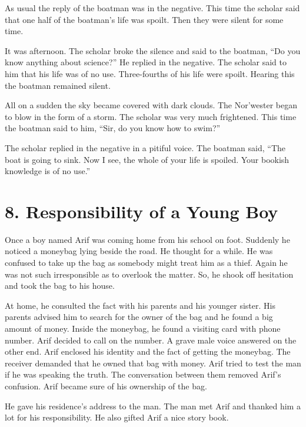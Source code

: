 \documentclass{article}
\begin{document}
As usual the reply of the boatman was in the negative. This time the scholar said that one half of the boatman's life was spoilt. Then they were silent for some time.

It was afternoon. The scholar broke the silence and said to the boatman, “Do you know anything about science?” He replied in the negative. The scholar said to him that his life was of no use. Three-fourths of his life were spoilt. Hearing this the boatman remained silent.

All on a sudden the sky became covered with dark clouds. The Nor'wester began to blow in the form of a storm. The scholar was very much frightened. This time the boatman said to him, “Sir, do you know how to swim?”

The scholar replied in the negative in a pitiful voice. The boatman said, “The boat is going to sink. Now I see, the whole of your life is spoiled. Your bookish knowledge is of no use.”

\section*{8. Responsibility of a Young Boy}
Once a boy named Arif was coming home from his school on foot. Suddenly he noticed a moneybag lying beside the road. He thought for a while. He was confused to take up the bag as somebody might treat him as a thief. Again he was not such irresponsible as to overlook the matter. So, he shook off hesitation and took the bag to his house.

At home, he consulted the fact with his parents and his younger sister. His parents advised him to search for the owner of the bag and he found a big amount of money. Inside the moneybag, he found a visiting card with phone number. Arif decided to call on the number. A grave male voice answered on the other end. Arif enclosed his identity and the fact of getting the moneybag. The receiver demanded that he owned that bag with money. Arif tried to test the man if he was speaking the truth. The conversation between them removed Arif's confusion. Arif became sure of his ownership of the bag.

He gave his residence's address to the man. The man met Arif and thanked him a lot for his responsibility. He also gifted Arif a nice story book.
\end{document}
